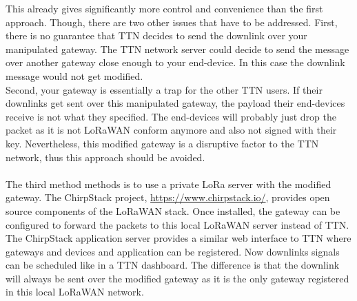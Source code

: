 This already gives significantly more control and convenience than the first approach. Though, there are two other issues that have to be addressed.
First, there is no guarantee that TTN decides to send the downlink over your manipulated gateway. The TTN network server could decide to send the message over another gateway close enough to
your end-device. In this case the downlink message would not get modified.
\\
Second, your gateway is essentially a trap for the other TTN users. If their downlinks get sent over this manipulated gateway, 
the payload their end-devices receive is not what they specified. The end-devices will probably just drop the packet as 
it is not LoRaWAN conform anymore and also not signed with their key. Nevertheless, this modified gateway is a disruptive factor 
to the TTN network, thus this approach should be avoided.
\\
\\
The third method methods is to use a private LoRa server with the modified gateway. 
The ChirpStack project, \url{https://www.chirpstack.io/}, provides open source components of the LoRaWAN stack. 
Once installed, the gateway can be configured to forward the packets to this local LoRaWAN server instead of TTN. 
The ChirpStack application server provides a similar web interface to TTN where gateways and devices and application can be registered.
Now downlinks signals can be scheduled like in a TTN dashboard. The difference is that the downlink will always be sent over the modified gateway
as it is the only gateway registered in this local LoRaWAN network.

